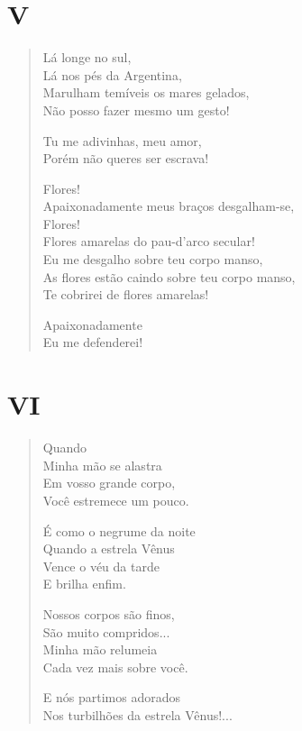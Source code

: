 \pagebreak
\section{V}

\begin{verse}
Lá longe no sul,\\
Lá nos pés da Argentina,\\
Marulham temíveis os mares gelados,\\
Não posso fazer mesmo um gesto!

Tu me adivinhas, meu amor,\\
Porém não queres ser escrava!

Flores!\\
Apaixonadamente meus braços desgalham-se,\\
Flores!\\
Flores amarelas do pau-d'arco secular!\\
Eu me desgalho sobre teu corpo manso,\\
As flores estão caindo sobre teu corpo manso,\\
Te cobrirei de flores amarelas!

Apaixonadamente\\
Eu me defenderei!
\end{verse}

\pagebreak
\section{VI}

\begin{verse}
Quando\\
Minha mão se alastra\\
Em vosso grande corpo,\\
Você estremece um pouco.

É como o negrume da noite\\
Quando a estrela Vênus\\
Vence o véu da tarde\\
E brilha enfim.

Nossos corpos são finos,\\
São muito compridos...\\
Minha mão relumeia\\
Cada vez mais sobre você.

E nós partimos adorados\\
Nos turbilhões da estrela Vênus!...
\end{verse}

